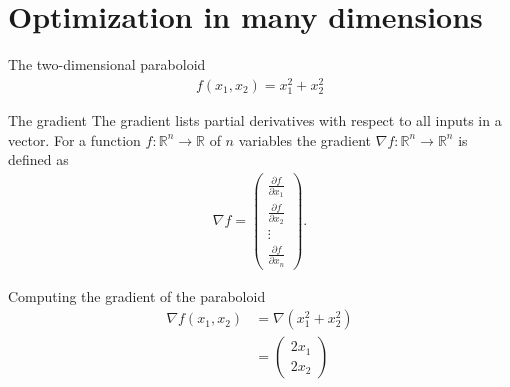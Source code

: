 \documentclass{beamer}
\begin{document}
    \section{Optimization in many dimensions}

    \begin{frame}{The two-dimensional paraboloid}
      \begin{align}
        f(x_1, x_2) = x_1^2 + x_2^2
      \end{align}
      \begin{figure}
        \centering
        
      \end{figure}
    \end{frame}

    \begin{frame}{The gradient}
      The gradient lists partial derivatives with respect to all inputs in a vector.
      For a function $f : \mathbb{R}^n \rightarrow \mathbb{R}$ of $n$ variables the gradient
      $\nabla f: \mathbb{R}^n \rightarrow \mathbb{R}^n$ is defined as
      \begin{align}
        \nabla f = \begin{pmatrix}
          \frac{\partial f}{\partial x_1} \\
          \frac{\partial f}{\partial x_2} \\
          \vdots \\
          \frac{\partial f}{\partial x_n} 
        \end{pmatrix}.
      \end{align}
    \end{frame}

    \begin{frame}{Computing the gradient of the paraboloid}
      \begin{align}
        \nabla f(x_1, x_2) &= \nabla (x_1^2 + x_2^2) \\
                           &= \begin{pmatrix}
                              2x_1 \\
                              2x_2
                              \end{pmatrix}
      \end{align}
    \end{frame}
\end{document}
